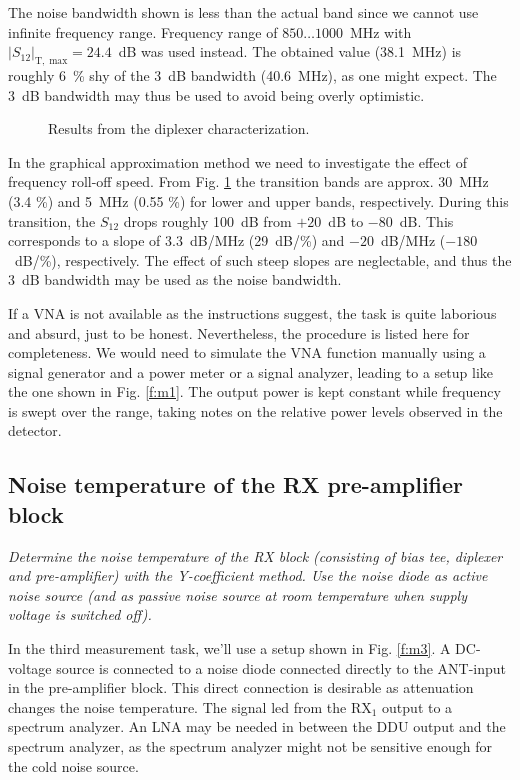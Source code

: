 \documentclass[a4paper, 12pt]{article}
\newlength{\oneLine}
\begin{document}
The noise bandwidth shown is less than the actual band since we cannot use infinite frequency 
range. Frequency range of $850 \ldots 1000$~MHz with $|S_{12}|_\mathrm{T,\;max} = 24.4$~dB 
was used instead. The obtained value (38.1~MHz) is roughly 6~\% shy of the 3~dB bandwidth 
(40.6~MHz), as one might expect. The 3~dB bandwidth may thus be used to avoid being 
overly optimistic.

\begin{figure}[h!]
	\begin{center}
	\caption{Results from the diplexer characterization.}
	\label{f:r1}
	\end{center}
	\vspace*{-12pt}
\end{figure}

In the graphical approximation method we need to investigate the effect of frequency 
roll-off speed. From Fig. \ref{f:r1} the transition bands are approx. 30~MHz (3.4 \%) 
and 5~MHz (0.55 \%) for lower and upper bands, respectively. During this transition, 
the $S_12$ drops roughly 100~dB from $+20$~dB to $-80$~dB. This corresponds to a slope 
of $3.3$~dB/MHz (29~dB/\%) and $-20$~dB/MHz ($-180$~dB/\%), respectively. The effect of 
such steep slopes are neglectable, and thus the 3~dB bandwidth may be used as the noise 
bandwidth.

If a VNA is not available as the instructions suggest, the task is quite laborious and 
absurd, just to be honest. Nevertheless, the procedure is listed here for completeness. 
We would need to simulate the VNA function manually using a signal generator and a power 
meter or a signal analyzer, leading to a setup like the one shown in Fig. \ref{f:m1}. The
output power is kept constant while frequency is swept over the range, taking notes on the 
relative power levels observed in the detector.


\subsection{Noise temperature of the RX pre-amplifier block}

\textit{Determine the noise temperature of the RX block (consisting of bias tee, 
diplexer and pre-amplifier) with the Y-coefficient method. Use the noise diode 
as active noise source (and as passive noise source at room temperature when 
supply voltage is switched off).}

\vspace*{\oneLine}
\noindent
In the third measurement task, we'll use a setup shown in Fig. \ref{f:m3}. 
A DC-voltage source is connected to a noise diode connected directly to the 
ANT-input in the pre-amplifier block. This direct connection is desirable as 
attenuation changes the noise temperature. The signal led from the RX$_1$ 
output to a spectrum analyzer. An LNA may be needed in between the DDU output 
and the spectrum analyzer, as the spectrum analyzer might not be sensitive 
enough for the cold noise source. 
\end{document}
